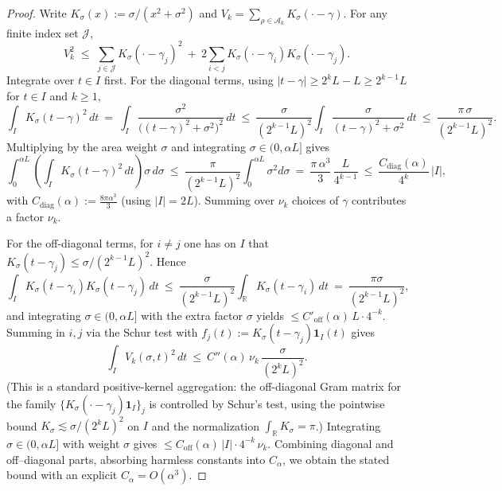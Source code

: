 \documentclass[11pt]{article}
\theoremstyle{definition}
\theoremstyle{remark}
\theoremstyle{definition}
\newcommand{\R}{\mathbb{R}}
\begin{document}
\begin{proof}
Write $K_\sigma(x):=\sigma/(x^2+\sigma^2)$ and $V_k=\sum_{\rho\in\mathcal A_k}K_\sigma(\cdot-\gamma)$. For any finite index set $\mathcal J$,
\[
  V_k^2\;\le\; \sum_{j\in\mathcal J} K_\sigma(\cdot-\gamma_j)^2\ +\ 2\!\!\sum_{i<j} K_\sigma(\cdot-\gamma_i)K_\sigma(\cdot-\gamma_j).
\]
Integrate over $t\in I$ first. For the diagonal terms, using $|t-\gamma|\ge 2^kL-L\ge 2^{k-1}L$ for $t\in I$ and $k\ge 1$,
\[
 \int_I K_\sigma(t-\gamma)^2\,dt\ =\ \int_I \frac{\sigma^2}{\big((t-\gamma)^2+\sigma^2\big)^2}\,dt
 \ \le\ \frac{\sigma}{(2^{k-1}L)^2}\int_I \frac{\sigma}{(t-\gamma)^2+\sigma^2}\,dt
 \ \le\ \frac{\pi\,\sigma}{(2^{k-1}L)^2}.
\]
Multiplying by the area weight $\sigma$ and integrating $\sigma\in(0,\alpha L]$ gives
\[
 \int_0^{\alpha L}\!\!\left(\int_I K_\sigma(t-\gamma)^2\,dt\right)\sigma\,d\sigma
 \ \le\ \frac{\pi}{(2^{k-1}L)^2}\int_0^{\alpha L}\!\sigma^2 d\sigma
 \ =\ \frac{\pi\,\alpha^3}{3}\,\frac{L}{4^{k-1}}
 \ \le\ \frac{C_{\mathrm{diag}}(\alpha)}{4^{k}}\,|I|,
\]
with $C_{\mathrm{diag}}(\alpha):=\tfrac{8\pi\alpha^3}{3}$ (using $|I|=2L$). Summing over $\nu_k$ choices of $\gamma$ contributes a factor $\nu_k$.

For the off-diagonal terms, for $i\ne j$ one has on $I$ that $K_\sigma(t-\gamma_j)\le \sigma/(2^{k-1}L)^2$. Hence
\[
 \int_I K_\sigma(t-\gamma_i)K_\sigma(t-\gamma_j)\,dt\ \le\ \frac{\sigma}{(2^{k-1}L)^2}\int_\R K_\sigma(t-\gamma_i)\,dt\ =\ \frac{\pi\sigma}{(2^{k-1}L)^2},
\]
and integrating $\sigma\in(0,\alpha L]$ with the extra factor $\sigma$ yields $\le C'_{\mathrm{off}}(\alpha)\,L\cdot 4^{-k}$. Summing in $i,j$ via the Schur test with $f_j(t):=K_\sigma(t-\gamma_j)\mathbf 1_I(t)$ gives
\[
 \int_I V_k(\sigma,t)^2\,dt\ \le\ C''(\alpha)\,\nu_k\,\frac{\sigma}{(2^kL)^2}.
\]
(This is a standard positive-kernel aggregation: the off-diagonal Gram matrix for the family $\{K_\sigma(\cdot-\gamma_j)\mathbf 1_I\}_j$ is controlled by Schur’s test, using the pointwise bound $K_\sigma\lesssim \sigma/(2^kL)^2$ on $I$ and the normalization $\int_\R K_\sigma=\pi$.)
Integrating $\sigma\in(0,\alpha L]$ with weight $\sigma$ gives $\le C_{\mathrm{off}}(\alpha)\,|I|\cdot 4^{-k}\,\nu_k$. Combining diagonal and off–diagonal parts, absorbing harmless constants into $C_\alpha$, we obtain the stated bound with an explicit $C_\alpha=O(\alpha^3)$.
\end{proof}
\end{document}
